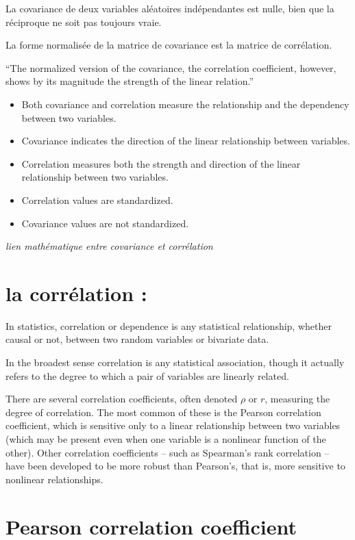 \documentclass[
]{report}
\providecommand{\tightlist}{%
  \setlength{\itemsep}{0pt}\setlength{\parskip}{0pt}}
\begin{document}
La covariance de deux variables aléatoires indépendantes est nulle, bien que la réciproque ne soit pas toujours vraie.

La forme normalisée de la matrice de covariance est la matrice de corrélation.

``The normalized version of the covariance, the correlation coefficient, however, shows by its magnitude the strength of the linear relation.''

\begin{itemize}
\tightlist
\item
  Both covariance and correlation measure the relationship and the dependency between two variables.
\item
  Covariance indicates the direction of the linear relationship between variables.
\item
  Correlation measures both the strength and direction of the linear relationship between two variables.
\item
  Correlation values are standardized.
\item
  Covariance values are not standardized.
\end{itemize}

\emph{lien mathématique entre covariance et corrélation}

\hypertarget{la-corruxe9lation-1}{%
\section{la corrélation :}\label{la-corruxe9lation-1}}

In statistics, correlation or dependence is any statistical relationship, whether causal or not, between two random variables or bivariate data.

In the broadest sense correlation is any statistical association, though it actually refers to the degree to which a pair of variables are linearly related.

There are several correlation coefficients, often denoted \(\rho\) or \(r\), measuring the degree of correlation. The most common of these is the Pearson correlation coefficient, which is sensitive only to a linear relationship between two variables (which may be present even when one variable is a nonlinear function of the other). Other correlation coefficients -- such as Spearman's rank correlation -- have been developed to be more robust than Pearson's, that is, more sensitive to nonlinear relationships.

\hypertarget{pearson-correlation-coefficient}{%
\section{Pearson correlation coefficient}\label{pearson-correlation-coefficient}}
\end{document}
